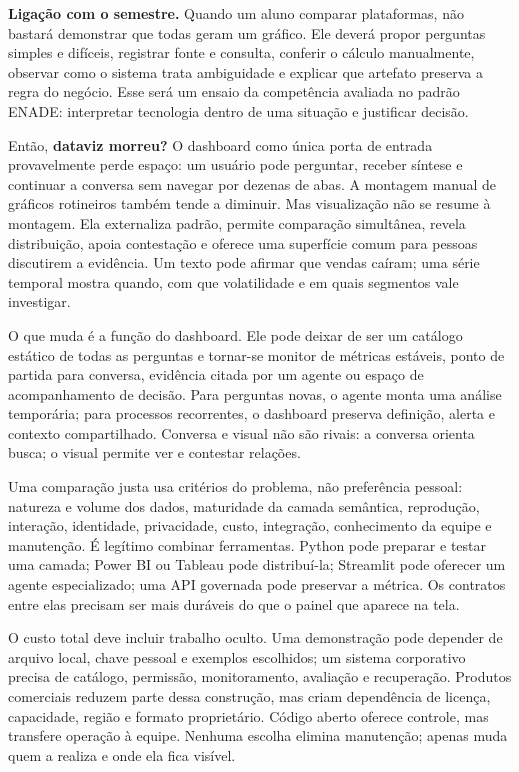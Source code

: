 \noindent\textbf{Ligação com o semestre.} Quando um aluno comparar plataformas, não bastará demonstrar que todas geram um gráfico. Ele deverá propor perguntas simples e difíceis, registrar fonte e consulta, conferir o cálculo manualmente, observar como o sistema trata ambiguidade e explicar que artefato preserva a regra do negócio. Esse será um ensaio da competência avaliada no padrão ENADE: interpretar tecnologia dentro de uma situação e justificar decisão.

Então, \textbf{dataviz morreu?} O dashboard como única porta de entrada provavelmente perde espaço: um usuário pode perguntar, receber síntese e continuar a conversa sem navegar por dezenas de abas. A montagem manual de gráficos rotineiros também tende a diminuir. Mas visualização não se resume à montagem. Ela externaliza padrão, permite comparação simultânea, revela distribuição, apoia contestação e oferece uma superfície comum para pessoas discutirem a evidência. Um texto pode afirmar que vendas caíram; uma série temporal mostra quando, com que volatilidade e em quais segmentos vale investigar.

O que muda é a função do dashboard. Ele pode deixar de ser um catálogo estático de todas as perguntas e tornar-se monitor de métricas estáveis, ponto de partida para conversa, evidência citada por um agente ou espaço de acompanhamento de decisão. Para perguntas novas, o agente monta uma análise temporária; para processos recorrentes, o dashboard preserva definição, alerta e contexto compartilhado. Conversa e visual não são rivais: a conversa orienta busca; o visual permite ver e contestar relações.

Uma comparação justa usa critérios do problema, não preferência pessoal: natureza e volume dos dados, maturidade da camada semântica, reprodução, interação, identidade, privacidade, custo, integração, conhecimento da equipe e manutenção. É legítimo combinar ferramentas. Python pode preparar e testar uma camada; Power BI ou Tableau pode distribuí-la; Streamlit pode oferecer um agente especializado; uma API governada pode preservar a métrica. Os contratos entre elas precisam ser mais duráveis do que o painel que aparece na tela.

O custo total deve incluir trabalho oculto. Uma demonstração pode depender de arquivo local, chave pessoal e exemplos escolhidos; um sistema corporativo precisa de catálogo, permissão, monitoramento, avaliação e recuperação. Produtos comerciais reduzem parte dessa construção, mas criam dependência de licença, capacidade, região e formato proprietário. Código aberto oferece controle, mas transfere operação à equipe. Nenhuma escolha elimina manutenção; apenas muda quem a realiza e onde ela fica visível.

